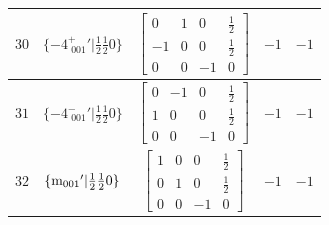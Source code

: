 \documentclass[fleqn,8pt]{jsarticle}
\begin{document}
\begin{longtable}{ccccc}
$ 30 $ & $ \{-4^{+}_{\,\,001}{}'|\frac{1}{2} \frac{1}{2} 0\} $ & $ \begin{bmatrix} 0 & 1 & 0 & \frac{1}{2} \\ -1 & 0 & 0 & \frac{1}{2} \\ 0 & 0 & -1 & 0 \end{bmatrix} $ & $ -1 $ & $ -1 $ \\ \hline
$ 31 $ & $ \{-4^{-}_{\,\,001}{}'|\frac{1}{2} \frac{1}{2} 0\} $ & $ \begin{bmatrix} 0 & -1 & 0 & \frac{1}{2} \\ 1 & 0 & 0 & \frac{1}{2} \\ 0 & 0 & -1 & 0 \end{bmatrix} $ & $ -1 $ & $ -1 $ \\ \hline
$ 32 $ & $ \{{\rm m}_{001}{}'|\frac{1}{2} \frac{1}{2} 0\} $ & $ \begin{bmatrix} 1 & 0 & 0 & \frac{1}{2} \\ 0 & 1 & 0 & \frac{1}{2} \\ 0 & 0 & -1 & 0 \end{bmatrix} $ & $ -1 $ & $ -1 $ \\
\end{longtable}
\end{document}
